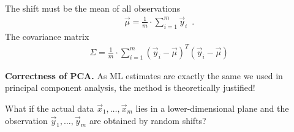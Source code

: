 \documentclass[landscape,footrule]{foils}
\newcommand{\lastline}{\vspace*{-2ex}}
\begin{document}

The shift must be the mean of all observations
\begin{align*}
\vec{\mu}=\frac{1}{m}\cdot \sum_{i=1}^m\vec{y}_i\enspace.
\end{align*} 
The covariance matrix 
\begin{align*}
\Sigma=\frac{1}{m}\cdot\sum_{i=1}^m(\vec{y}_i-\vec{\mu})^T (\vec{y}_i-\vec{\mu})
\end{align*}

\textbf{Correctness of PCA.}
As ML estimates are exactly the same  we used in principal component analysis, the method is theoretically justified!\lastline




What if the actual data $\vec{x}_1,\ldots,\vec{x}_m$ lies in a lower-dimensional plane and the observation  $\vec{y}_1,\ldots,\vec{y}_m$ are obtained by random shifts?   
\end{document}
